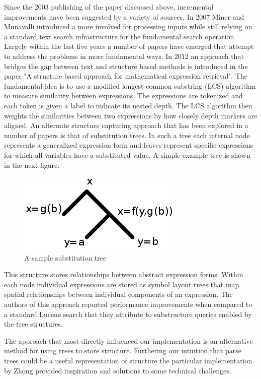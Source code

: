 \documentclass{sig-alternate}
\begin{document}
Since the 2003 publishing of the paper discussed above, incremental
improvements have been suggested by a variety of sources. In 2007 Miner
and Munavalli introduced a more involved for processing inputs while
still relying on a standard text search infrastructure for the 
fundamental search operation.\cite{miner:approach} Largely within the last five years a number of 
papers have emerged that attempt to address the problems in more
fundamental ways.
In 2012 an approach that bridges the gap between text and structure based
methods is introduced in the paper "A structure based
approach for mathematical expression retrieval".\cite{kumar:structure} The fundamental
idea is to use a modified longest common substring (LCS) algorithm to 
measure similarity between expressions. The expressions are tokenized
and each token is given a label to indicate its nested depth. The LCS
algorithm then weights the similarities between two expressions by how
closely depth markers are aligned. 
An alternate structure capturing approach that has been explored in
a number of papers is that of substitution trees.\cite{kolhase:mathwebsearch}\cite{yuan:layout} In such a tree each
internal node represents a generalized expression form and leaves
represent specific expressions for which all variables have a 
substituted value. A simple example tree is shown in the next figure.
\begin{figure}
	\centering
    \includegraphics[scale=0.75]{subtree}
	\caption{A sample substitution tree}
\end{figure}
This structure stores relationships between abstract expression forms.
Within each node individual expressions are stored as symbol layout trees
that map spatial relationships between individual components of an expression.
The authors of this approach reported performance improvements when compared
to a standard Lucene search that they attribute to substructure queries 
enabled by the tree structures. 

The approach that most directly influenced our implementation is an
alternative method for using trees to store structure. Furthering our
intuition that parse trees could be a useful representation of structure
the particular implementation by Zhong provided inspiration and 
solutions to some technical challenges.\cite{zhong:cowpie}
\end{document}
